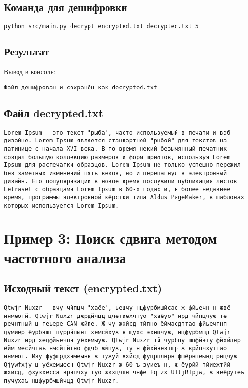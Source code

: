 \documentclass[a4paper, 14pt]{report}
\begin{document}
\subsection{Команда для дешифровки}
\begin{lstlisting}[language=bash]
python src/main.py decrypt encrypted.txt decrypted.txt 5
\end{lstlisting}

\subsection{Результат}
Вывод в консоль:
\begin{lstlisting}
Файл дешифрован и сохранён как decrypted.txt
\end{lstlisting}

\subsection{Файл decrypted.txt}
\begin{lstlisting}
Lorem Ipsum - это текст-"рыба", часто используемый в печати и вэб-дизайне. Lorem Ipsum является стандартной "рыбой" для текстов на латинице с начала XVI века. В то время некий безымянный печатник создал большую коллекцию размеров и форм шрифтов, используя Lorem Ipsum для распечатки образцов. Lorem Ipsum не только успешно пережил без заметных изменений пять веков, но и перешагнул в электронный дизайн. Его популяризации в новое время послужили публикация листов Letraset с образцами Lorem Ipsum в 60-х годах и, в более недавнее время, программы электронной вёрстки типа Aldus PageMaker, в шаблонах которых используется Lorem Ipsum.
\end{lstlisting}

\section{Пример 3: Поиск сдвига методом частотного анализа}

\subsection{Исходный текст (encrypted.txt)}
\begin{lstlisting}
Qtwjr Nuxzr - вчу чйпцч-"хаёе", ьецчу нцфурбмшйсао ж фйьечн н жвё-инмеотй. Qtwjr Nuxzr джрдйчцд цчетиехчтуо "хаёуо" ирд чйпцчуж те речнтный ц теьере CAN жйпе. Ж чу жхйсд тйпно ёймасдттао фйьечтнп цумиер ёурбэшг пуррйпынг хемсйхуж н щухс эхнщчуж, нцфурбмшд Qtwjr Nuxzr ирд хецфйьечпн уёхемыуж. Qtwjr Nuxzr тй чурбпу шцфйэту фйхйлнр ёйм месйчтаъ нмсйтйтно фдчб жйпуж, ту н фйхйэезтшр ж врйпчхуттао инмеот. Йзу фуфшрдхнмеынн ж тужуй жхйсд фуцршлнрн фшёрнпеынд рнцчуж Qjywfxjy ц уёхемыесн Qtwjr Nuxzr ж 60-ъ зуиеъ н, ж ёурйй тйиежтйй жхйсд, фхузхесса врйпчхуттуо жкхцчпн чнфе Fqizx UfljRfpjw, ж эеёрутеъ пучухаъ нцфурбмшйчцд Qtwjr Nuxzr.
\end{lstlisting}
\end{document}
